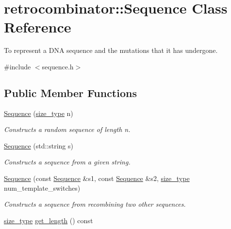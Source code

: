 \hypertarget{classretrocombinator_1_1Sequence}{}\section{retrocombinator\+:\+:Sequence Class Reference}
\label{classretrocombinator_1_1Sequence}


To represent a D\+NA sequence and the mutations that it has undergone.  




{\ttfamily \#include $<$sequence.\+h$>$}

\subsection*{Public Member Functions}
\begin{DoxyCompactItemize}
\item 
\hyperlink{classretrocombinator_1_1Sequence_a04d0d6977316f2ab30844e584c4531ec}{Sequence} (\hyperlink{namespaceretrocombinator_a8e1541b50cee66a791df4c437ccbb385}{size\+\_\+type} n)
\begin{DoxyCompactList}\small\item\em Constructs a random sequence of length {\itshape n}. \end{DoxyCompactList}\item 
\hyperlink{classretrocombinator_1_1Sequence_af5b3b62eba07f0e09f532fcf1681c289}{Sequence} (std\+::string s)
\begin{DoxyCompactList}\small\item\em Constructs a sequence from a given string. \end{DoxyCompactList}\item 
\hyperlink{classretrocombinator_1_1Sequence_af334c44bea806196b5037e61b0e831b1}{Sequence} (const \hyperlink{classretrocombinator_1_1Sequence}{Sequence} \&s1, const \hyperlink{classretrocombinator_1_1Sequence}{Sequence} \&s2, \hyperlink{namespaceretrocombinator_a8e1541b50cee66a791df4c437ccbb385}{size\+\_\+type} num\+\_\+template\+\_\+switches)
\begin{DoxyCompactList}\small\item\em Constructs a sequence from recombining two other sequences. \end{DoxyCompactList}\item 
\mbox{\label{classretrocombinator_1_1Sequence_aeefc98943c08769af4ed9f73157d26d1}} 
\hyperlink{namespaceretrocombinator_a8e1541b50cee66a791df4c437ccbb385}{size\+\_\+type} \hyperlink{classretrocombinator_1_1Sequence_aeefc98943c08769af4ed9f73157d26d1}{get\+\_\+length} () const

\end{DoxyCompactItemize}
